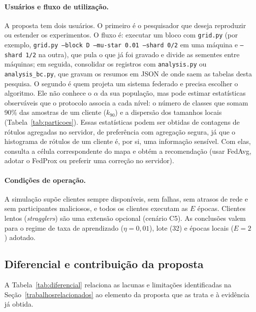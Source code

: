 \paragraph{Usuários e fluxo de utilização.} A proposta tem dois usuários. O primeiro é o pesquisador que deseja reproduzir ou estender os experimentos. O fluxo é: executar um bloco com \texttt{grid.py} (por exemplo, \texttt{grid.py --block D --mu-star 0.01 --shard 0/2} em uma máquina e \texttt{--shard 1/2} na outra), que pula o que já foi gravado e divide as sementes entre máquinas; em seguida, consolidar os registros com \texttt{analysis.py} ou \texttt{analysis\_bc.py}, que gravam os resumos em JSON de onde saem as tabelas desta pesquisa. O segundo é quem projeta um sistema federado e precisa escolher o algoritmo. Ele não conhece o $\alpha$ da sua população, mas pode estimar estatísticas observáveis que o protocolo associa a cada nível: o número de classes que somam 90\% das amostras de um cliente ($k_{90}$) e a dispersão dos tamanhos locais (Tabela~\ref{tab:particoes}). Essas estatísticas podem ser obtidas de contagens de rótulos agregadas no servidor, de preferência com agregação segura, já que o histograma de rótulos de um cliente é, por si, uma informação sensível. Com elas, consulta a célula correspondente do mapa e obtém a recomendação (usar FedAvg, adotar o FedProx ou preferir uma correção no servidor).

\paragraph{Condições de operação.} A simulação supõe clientes sempre disponíveis, sem falhas, sem atrasos de rede e sem participantes maliciosos, e todos os clientes executam as $E$ épocas. Clientes lentos (\textit{stragglers}) são uma extensão opcional (cenário C5). As conclusões valem para o regime de taxa de aprendizado ($\eta = 0{,}01$), lote (32) e épocas locais ($E = 2$) adotado.

\subsection{Diferencial e contribuição da proposta}
\label{sec:diferencial}

A Tabela~\ref{tab:diferencial} relaciona as lacunas e limitações identificadas na Seção~\ref{trabalhosrelacionados} ao elemento da proposta que as trata e à evidência já obtida.

